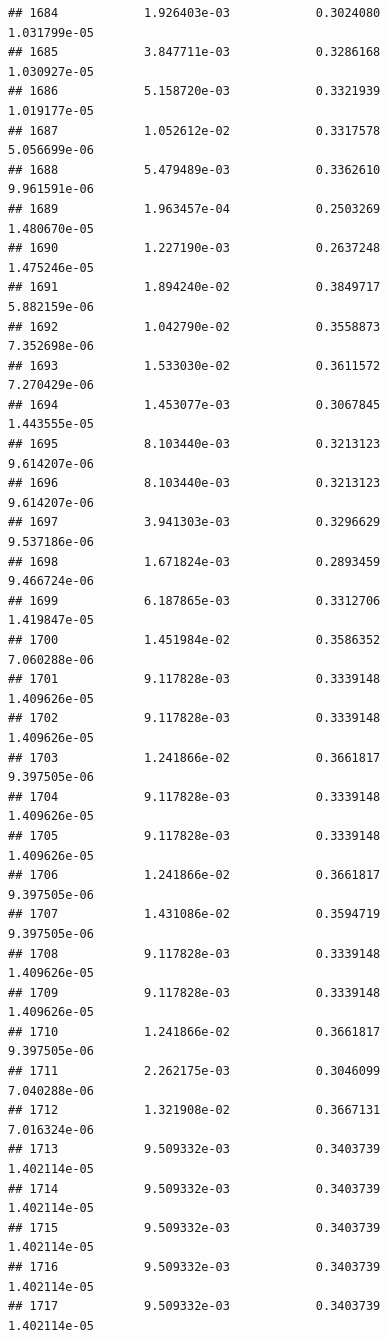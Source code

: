 \documentclass[
]{article}
\begin{document}
\begin{verbatim}
## 1684            1.926403e-03            0.3024080            1.031799e-05
## 1685            3.847711e-03            0.3286168            1.030927e-05
## 1686            5.158720e-03            0.3321939            1.019177e-05
## 1687            1.052612e-02            0.3317578            5.056699e-06
## 1688            5.479489e-03            0.3362610            9.961591e-06
## 1689            1.963457e-04            0.2503269            1.480670e-05
## 1690            1.227190e-03            0.2637248            1.475246e-05
## 1691            1.894240e-02            0.3849717            5.882159e-06
## 1692            1.042790e-02            0.3558873            7.352698e-06
## 1693            1.533030e-02            0.3611572            7.270429e-06
## 1694            1.453077e-03            0.3067845            1.443555e-05
## 1695            8.103440e-03            0.3213123            9.614207e-06
## 1696            8.103440e-03            0.3213123            9.614207e-06
## 1697            3.941303e-03            0.3296629            9.537186e-06
## 1698            1.671824e-03            0.2893459            9.466724e-06
## 1699            6.187865e-03            0.3312706            1.419847e-05
## 1700            1.451984e-02            0.3586352            7.060288e-06
## 1701            9.117828e-03            0.3339148            1.409626e-05
## 1702            9.117828e-03            0.3339148            1.409626e-05
## 1703            1.241866e-02            0.3661817            9.397505e-06
## 1704            9.117828e-03            0.3339148            1.409626e-05
## 1705            9.117828e-03            0.3339148            1.409626e-05
## 1706            1.241866e-02            0.3661817            9.397505e-06
## 1707            1.431086e-02            0.3594719            9.397505e-06
## 1708            9.117828e-03            0.3339148            1.409626e-05
## 1709            9.117828e-03            0.3339148            1.409626e-05
## 1710            1.241866e-02            0.3661817            9.397505e-06
## 1711            2.262175e-03            0.3046099            7.040288e-06
## 1712            1.321908e-02            0.3667131            7.016324e-06
## 1713            9.509332e-03            0.3403739            1.402114e-05
## 1714            9.509332e-03            0.3403739            1.402114e-05
## 1715            9.509332e-03            0.3403739            1.402114e-05
## 1716            9.509332e-03            0.3403739            1.402114e-05
## 1717            9.509332e-03            0.3403739            1.402114e-05

\end{verbatim}
\end{document}
